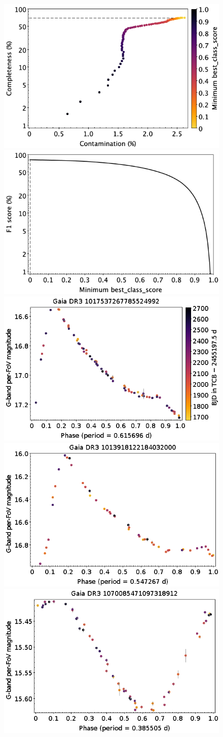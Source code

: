 \documentclass[longauth]{aa}
\begin{document}
\begin{appendix}
\begin{figure}
\centering
{} \includegraphics[width=0.45\hsize]{figures/appendix/RR_cls_scc.png}  
\hspace{2mm}
 \includegraphics[width=0.45\hsize]{figures/appendix/RR_cls_sf1.png} \\  
\vspace{4mm}
 \includegraphics[width=0.45\hsize]{figures/appendix/RRab-74.png}  
\hspace{2mm}
 \includegraphics[width=0.45\hsize]{figures/appendix/RRab-63.png} \\
\vspace{4mm}
 \includegraphics[width=0.45\hsize]{figures/appendix/RRc-90.png}  

\end{figure}
\end{appendix}
\end{document}
